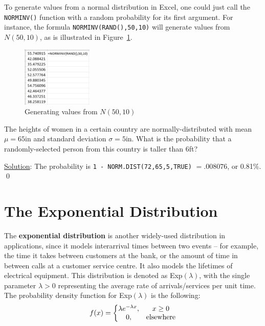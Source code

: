 To generate values from a normal distribution in Excel, one could just call the \texttt{NORMINV()} function with a random probability for its first argument.
For instance, the formula \texttt{NORMINV(RAND(),50,10)} will generate values from $N(50,10)$, as is illustrated in Figure~\ref{fig:2_normal_excel}.

\begin{figure}[htbp]
	\centering
	\includegraphics[width=0.3\textwidth]{fig/2_normal_excel.png}
	\caption{Generating values from $N(50,10)$ \label{fig:2_normal_excel}}
\end{figure}

\begin{myexample}
The heights of women in a certain country are normally-distributed with mean $\mu = 65$in and standard deviation $\sigma = 5$in. What is the probability that a randomly-selected person from this country is taller than 6ft?

\underline{Solution}: The probability is \texttt{1 - NORM.DIST(72,65,5,TRUE)} $ = .008076$, or 0.81\%. \qed
\end{myexample}

\section{The Exponential Distribution}\label{sec:2_expo}

The \textbf{exponential distribution} is another widely-used distribution in applications, since it models interarrival times between two events -- for example, the time it takes between customers at the bank, or the amount of time in between calls at a customer service centre.
It also models the lifetimes of electrical equipment.
This distribution is denoted as Exp$(\lambda)$, with the single parameter $\lambda > 0$ representing the average rate of arrivals/services per unit time.
The probability density function for Exp$(\lambda)$ is the following: 
\[f(x) = \left\{ \begin{matrix} \lambda e^{-\lambda x}, & x \geq 0 \cr 0, & \text{elsewhere} \end{matrix} \right. \]

